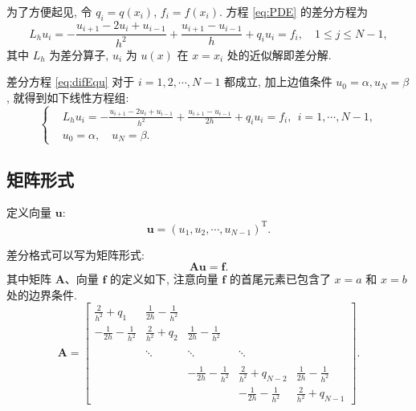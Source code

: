 \documentclass[openany,twoside,12pt]{book}
\theoremstyle{plain}
\begin{document}
为了方便起见, 令 $q_{i}=q(x_{i})$, $f_{i}=f(x_{i})$. 方程 \eqref{eq:PDE} 的差分方程为
\begin{equation}\label{eq:difEqu}
  L_{h} u_{i}=-\frac{u_{i+1}-2 u_{i}+u_{i-1}}{h^{2}}+\frac{u_{i+1}-u_{i-1}}{h}+q_{i} u_{i}=f_{i},\quad 1 \leqslant j \leqslant N-1,
\end{equation}
其中 $L_{h}$ 为差分算子, $u_i$ 为 $u(x)$ 在 $x=x_i$ 处的近似解即差分解.

差分方程 \eqref{eq:difEqu} 对于 $i=1,2, \cdots, N-1$ 都成立, 加上边值条件 $u_{0}=\alpha, u_{N}=\beta$, 就得到如下线性方程组:
\begin{equation}\label{eq:fdm}
\left\{\begin{aligned}
& L_{h} u_{i}=-\frac{u_{i+1}-2 u_{i}+u_{i-1}}{h^{2}}+\frac{u_{i+1}-u_{i-1}}{2h}+q_{i} u_{i}=f_{i}, ~~ i=1, \cdots, N-1, \\
& u_{0}=\alpha, \quad u_{N}=\beta.
\end{aligned}\right.
\end{equation}


\subsection{矩阵形式}

定义向量 $\boldsymbol{u}$:
\begin{equation*}
  \boldsymbol{u}=(u_{1}, u_{2}, \cdots, u_{N-1})^{\mathrm{T}}.
\end{equation*}

差分格式可以写为矩阵形式:
\begin{equation*}
  \boldsymbol{A}\boldsymbol{u}=\boldsymbol{f}.
\end{equation*}
其中矩阵 $\boldsymbol{A}$、向量 $\boldsymbol{f}$ 的定义如下, 注意向量 $\boldsymbol{f}$ 的首尾元素已包含了 $x=a$ 和 $x=b$ 处的边界条件.
\begin{equation}\label{eq:matrix1}
\boldsymbol{A}=\begin{bmatrix}
\frac{2}{h^{2}}+q_{1} & \frac{1}{2h}-\frac{1}{h^{2}} &   &  &  \\[8pt]
 -\frac{1}{2h}-\frac{1}{h^{2}} & \frac{2}{h^{2}}+q_{2} & \frac{1}{2h}-\frac{1}{h^{2}}  & &  \\[8pt]
  &  &  &  &    \\
  &  \ddots  & \ddots  &  \ddots  &  \\[8pt]
  &  &  &  &    \\
  &   & -\frac{1}{2h}-\frac{1}{h^{2}} & \frac{2}{h^{2}}+q_{N-2}& \frac{1}{2h}-\frac{1}{h^{2}} \\[8pt]
  &  &  & -\frac{1}{2h}-\frac{1}{h^{2}} & \frac{2}{h^{2}}+q_{N-1}
\end{bmatrix}.
\end{equation}
\end{document}
